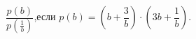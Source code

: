 \begin{ex}[type=calculate_expression]
	\begin{condition}
		\( \dfrac{p(b)}{p\left( \frac{1}{b} \right)} \),\quad если \( p(b)=\left( b+\dfrac{3}{b} \right)\cdot\left( 3b+\dfrac{1}{b} \right) \).
	\end{condition}
\end{ex}